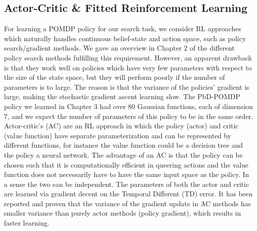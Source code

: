 \subsection{Actor-Critic \& Fitted Reinforcement Learning}
For learning a POMDP policy for our search task, we consider RL approaches which naturally handles continuous 
belief-state and action space, such as policy search/gradient methods. We gave an overview in Chapter 2 of the different policy search methods 
fulfilling this requirement. However, an apparent drawback is that they work well on policies 
which have very few parameters with respect to the size of the state space, but they will perform poorly if the 
number of parameters is to large. The reason is that the variance of the policies' gradient
is large, making the stochastic gradient ascent learning slow. The PbD-POMDP policy we learned in 
Chapter 3 had over 80 Gaussian functions, each of dimension 7, and we expect the number of parameters of 
this policy to be in the same order.
Actor-critic's (AC) \cite[Chap. 6.6]{Sutton00policygradient} are an RL approach in which the policy (actor) and critic (value function) have separate
parameterization and can be represented by different functions, for instance the value function could be a 
decision tree and the policy a neural network. The advantage of an AC is that the policy can be chosen such 
that it is computationally efficient in queering actions and the value function does not necessarily have to have
the same input space as the policy. In a sense the two can be independent. The parameters of both the actor 
and critic are learned via gradient decent on the Temporal Different (TD) error. It has been reported and 
proven \cite{rl_ac_surv_2012} that the variance of the gradient update in AC methods has smaller variance than 
purely actor methods (policy gradient), which results in faster learning. 






